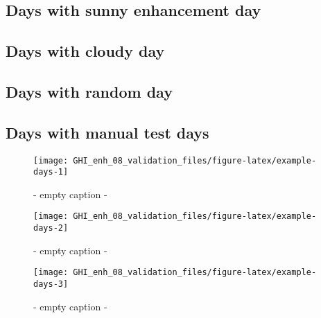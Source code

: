 \documentclass[
  10pt,
  a4paper,oneside]{article}
\begin{document}
\FloatBarrier

\hypertarget{days-with-sunny-enhancement-day}{%
\subsection{Days with sunny enhancement day}\label{days-with-sunny-enhancement-day}}

\FloatBarrier

\hypertarget{days-with-cloudy-day}{%
\subsection{Days with cloudy day}\label{days-with-cloudy-day}}

\FloatBarrier

\hypertarget{days-with-random-day}{%
\subsection{Days with random day}\label{days-with-random-day}}

\FloatBarrier

\hypertarget{days-with-manual-test-days}{%
\subsection{Days with manual test days}\label{days-with-manual-test-days}}

\begin{figure}[H]

{\centering \texttt{[image: GHI\_enh\_08\_validation\_files/figure-latex/example-days-1]} 

}

\caption{ - empty caption - }\label{fig:example-days-1}
\end{figure}

\begin{figure}[H]

{\centering \texttt{[image: GHI\_enh\_08\_validation\_files/figure-latex/example-days-2]} 

}

\caption{ - empty caption - }\label{fig:example-days-2}
\end{figure}

\begin{figure}[H]

{\centering \texttt{[image: GHI\_enh\_08\_validation\_files/figure-latex/example-days-3]} 

}

\caption{ - empty caption - }\label{fig:example-days-3}
\end{figure}
\end{document}
